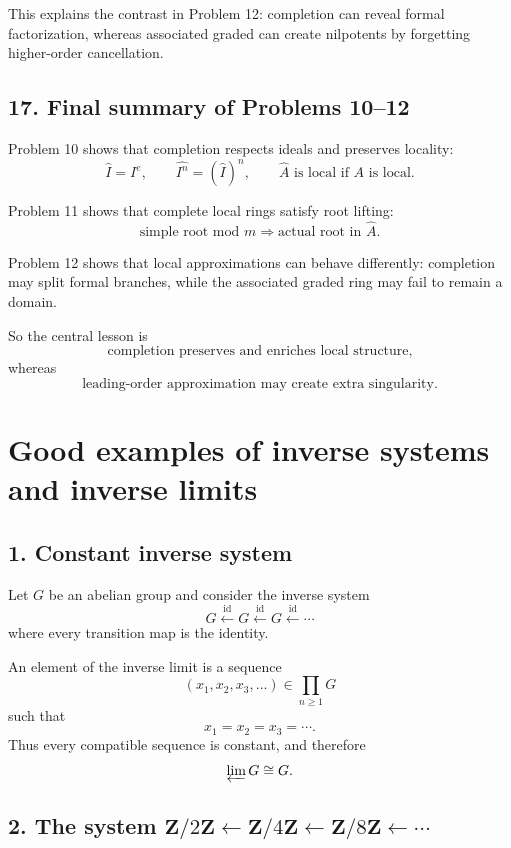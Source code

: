 \documentclass[12pt,a4paper]{article}
\theoremstyle{plain}
\theoremstyle{definition}      %
\begin{document}
	This explains the contrast in Problem 12:
	completion can reveal formal factorization, whereas associated graded can create nilpotents by forgetting higher-order cancellation.
	
	\subsection*{17. Final summary of Problems 10--12}
	
	Problem 10 shows that completion respects ideals and preserves locality:
	\[
	\widehat I=I^e,\qquad
	\widehat{I^n}=(\widehat I)^n,\qquad
	\widehat A \text{ is local if }A\text{ is local}.
	\]
	
	Problem 11 shows that complete local rings satisfy root lifting:
	\[
	\text{simple root mod }m
	\Longrightarrow
	\text{actual root in }\widehat A.
	\]
	
	Problem 12 shows that local approximations can behave differently:
	completion may split formal branches, while the associated graded ring may fail to remain a domain.
	
	So the central lesson is
	\[
	\boxed{\text{completion preserves and enriches local structure,}}
	\]
	whereas
	\[
	\boxed{\text{leading-order approximation may create extra singularity.}}
	\]
	
	
	\section*{Good examples of inverse systems and inverse limits}
	
	\subsection*{1. Constant inverse system}
	
	Let \(G\) be an abelian group and consider the inverse system
	\[
	G \xleftarrow{\mathrm{id}} G \xleftarrow{\mathrm{id}} G \xleftarrow{\mathrm{id}} \cdots
	\]
	where every transition map is the identity.
	
	An element of the inverse limit is a sequence
	\[
	(x_1,x_2,x_3,\dots)\in \prod_{n\ge 1} G
	\]
	such that
	\[
	x_1=x_2=x_3=\cdots.
	\]
	Thus every compatible sequence is constant, and therefore
	\[
	\varprojlim G \cong G.
	\]
	
	\subsection*{2. The system \(\mathbf Z/2\mathbf Z \leftarrow \mathbf Z/4\mathbf Z \leftarrow \mathbf Z/8\mathbf Z \leftarrow \cdots\)}
	
\end{document}
